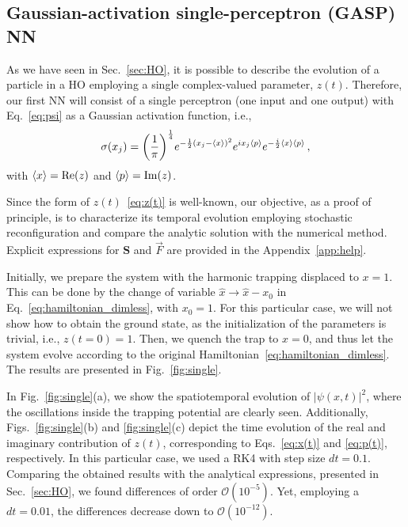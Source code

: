 \documentclass[aps,pre,superscriptaddress,amsmath,amssymb,amsfonts,twocolumn,showpacs,notitlepage]{revtex4-1}
\begin{document}
\subsection{Gaussian-activation single-perceptron (GASP) NN} \label{sec:single_NN}

	As we have seen in Sec.~\ref{sec:HO}, it is possible to describe the evolution of a particle in a HO employing a single complex-valued parameter, $z(t)$.
	Therefore, our first NN will consist of a single perceptron (one input and one output) with Eq.~\eqref{eq:psi} as a Gaussian activation function, i.e.,
	\begin{equation} \label{eq:activation_gaussian}
		\sigma(x_j)=  \qty(\frac{1}{\pi})^{\frac{1}{4}}e^{-\frac{1}{2}(x_j-\ev{x})^2}e^{ix_j\ev{p}}e^{-\frac{i}{2}\ev{x}\ev{p}} \,,
	\end{equation}
	with $\ev{x} = \Re(z)$ and $\ev{p}=\Im(z)$.
	
	Since the form of $z(t)$~\eqref{eq:z(t)} is well-known, our objective, as a proof of principle, is to characterize its temporal evolution employing stochastic reconfiguration and compare the analytic solution with the numerical method.
	Explicit expressions for $\bm{S}$ and $\vec{F}$ are provided in the Appendix~\ref{app:help}.
	
	
	Initially, we prepare the system with the harmonic trapping displaced to $x=1$.
	This can be done by the change of variable $\hat{x}\to\hat{x}-x_0$ in Eq.~\eqref{eq:hamiltonian_dimless}, with $x_0=1$.
	For this particular case, we will not show how to obtain the ground state, as the initialization of the parameters is trivial, i.e., $z(t=0)=1$.
	Then, we quench the trap to $x=0$, and thus let the system evolve according to the original Hamiltonian~\eqref{eq:hamiltonian_dimless}.
	The results are presented in Fig.~\ref{fig:single}.
	
	In Fig.~\ref{fig:single}(a), we show the spatiotemporal evolution of $|\psi(x,t)|^2$, where the oscillations inside the trapping potential are clearly seen.
	Additionally, Figs.~\ref{fig:single}(b) and \ref{fig:single}(c) depict the time evolution of the real and imaginary contribution of $z(t)$, corresponding to Eqs.~\eqref{eq:x(t)} and \eqref{eq:p(t)}, respectively.
	In this particular case, we used a RK4 with step size $dt=0.1$.
	Comparing the obtained results with the analytical expressions, presented in Sec.~\ref{sec:HO}, we found differences of order $\mathcal{O}(10^{-5})$.
	Yet, employing a $dt=0.01$, the differences decrease down to $\mathcal{O}(10^{-12})$.  
	
\end{document}
